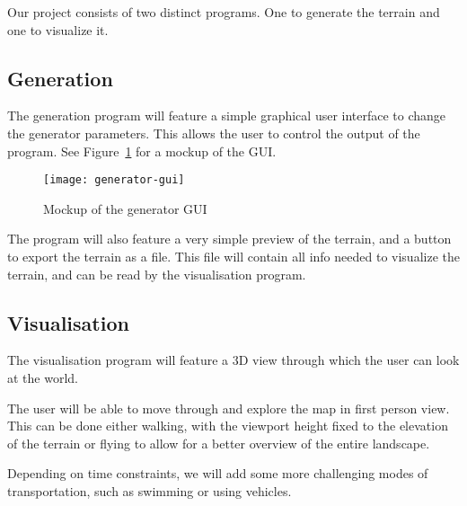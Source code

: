 Our project consists of two distinct programs.
One to generate the terrain and one to visualize it.

\subsection{Generation}

The generation program will feature a simple graphical user interface to change the generator parameters.
This allows the user to control the output of the program.
See Figure~\ref{fig:gui-mockup} for a mockup of the GUI.

\begin{figure}[H]
	\centering
	\texttt{[image: generator-gui]}
	\caption{Mockup of the generator GUI}
	\label{fig:gui-mockup}
\end{figure}

The program will also feature a very simple preview of the terrain, and a button to export the terrain as a file.
This file will contain all info needed to visualize the terrain, and can be read by the visualisation program.

\subsection{Visualisation}

The visualisation program will feature a 3D view through which the user can look at the world.

The user will be able to move through and explore the map in first person view.
This can be done either walking, with the viewport height fixed to the elevation of the terrain or flying to allow for a better overview of the entire landscape.

Depending on time constraints, we will add some more challenging modes of transportation, such as swimming or using vehicles.

